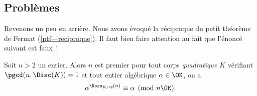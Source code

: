 \subsection{Problèmes}

Revenons un peu en arrière. Nous avons évoqué la réciproque du petit théorème de Fermat (\ref{ptf—reciproque}). Il faut bien faire attention au fait que l'énoncé suivant est faux~!

\begin{enoncefaux}
	Soit $n>2$ un entier. Alors $n$ est premier \ssi pour tout corps \emph{quadratique} $K$ vérifiant $\pgcd(n, \Disc(K)) = 1$ et tout entier algébrique $\alpha \in \OK$, on a $$\alpha^{\Norm_{K/\Q}(n)} \equiv \alpha \pmod{n\OK}.$$
\end{enoncefaux}
